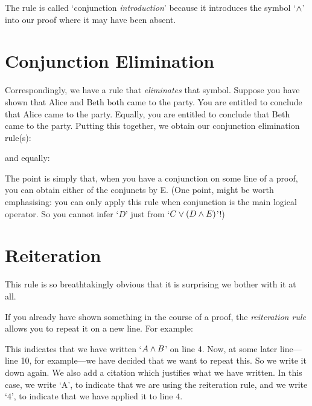 The rule is called `conjunction \emph{introduction}' because it introduces the symbol `$\mathbin{\wedge}$' into our proof where it may have been absent.

\section{Conjunction Elimination}
Correspondingly, we have a rule that \emph{eliminates} that symbol.  Suppose you have shown that Alice and Beth both came to the party. You are entitled to conclude that Alice came to the party. Equally, you are entitled to conclude that Beth came to the party. Putting this together, we obtain our conjunction elimination rule(s):
\begin{highlighted}
\begin{fitchproof}
	\ellipsesline
	\ellipsesline
	 
\end{fitchproof}\end{highlighted}
and equally:
\begin{highlighted}
\begin{fitchproof}
\ellipsesline
	\ellipsesline
	 
\end{fitchproof}\end{highlighted}
The point is simply that, when you have a conjunction on some line of a proof, you can obtain either of the conjuncts by {\eand}E. (One point, might be worth emphasising: you can only apply this rule when conjunction is the main logical operator. So you cannot infer `$D$' just from `$C \vee (D \mathbin{\wedge} E)$'!)


\section{Reiteration}\label{sec:Reiteration}
This rule is so breathtakingly obvious that it is surprising we bother with it at all.

If you already have shown something in the course of a proof, the \emph{reiteration rule} allows you to repeat it on a new line. For example:
\begin{fitchproof}
	\have[$\vdots$]{}{\vdots}
	\have[$\vdots$]{}{\vdots}
	 
\end{fitchproof}
This indicates that we have written `$A \mathbin{\wedge} B$' on line 4. Now, at some later line---line 10, for example---we have decided that we want to repeat this. So we write it down again. We also add a citation which justifies what we have written. In this case, we write `A', to indicate that we are using the reiteration rule, and we write `$4$', to indicate that we have applied it to line $4$.

